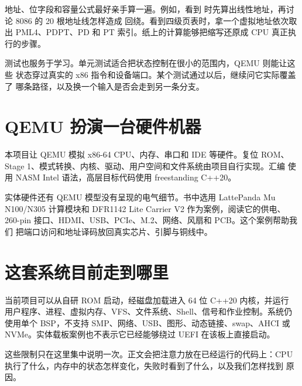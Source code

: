 地址、位字段和容量公式最好亲手算一遍。例如，看到
 时先算出线性地址，再讨论 8086 的 20 根地址线怎样造成
回绕。看到四级页表时，拿一个虚拟地址依次取出 PML4、PDPT、PD 和 PT
索引。纸上的计算能够把缩写还原成 CPU 真正执行的步骤。

测试也服务于学习。单元测试适合把状态控制在很小的范围内，QEMU 则能让这些
状态穿过真实的 x86 指令和设备端口。某个测试通过以后，继续问它实际覆盖了
哪条路径，以及换一个输入是否会走到另一条分支。

\section*{QEMU 扮演一台硬件机器}

本项目让 QEMU 模拟 x86-64 CPU、内存、串口和 IDE 等硬件。复位 ROM、
Stage 1、模式转换、内核、驱动、用户空间和文件系统由项目自行实现。汇编
使用 NASM Intel 语法，高层目标代码使用 freestanding C++20。

实体硬件还有 QEMU 模型没有呈现的电气细节。书中选用 LattePanda Mu
N100/N305 计算模块和 DFR1142 Lite Carrier V2 作为案例，阅读它的供电、
260-pin 接口、HDMI、USB、PCIe、M.2、网络、风扇和 PCB。这个案例帮助我们
把端口访问和地址译码放回真实芯片、引脚与铜线中。

\section*{这套系统目前走到哪里}

当前项目可以从自研 ROM 启动，经磁盘加载进入 64 位 C++20 内核，并运行
用户程序、进程、虚拟内存、VFS、文件系统、Shell、信号和作业控制。系统仍
使用单个 BSP，不支持 SMP、网络、USB、图形、动态链接、swap、AHCI 或
NVMe。实体载板案例也不表示它已经能够绕过 UEFI 在该板上直接启动。

这些限制只在这里集中说明一次。正文会把注意力放在已经运行的代码上：CPU
执行了什么，内存中的状态怎样变化，失败时看到了什么，以及我们怎样找到
原因。
